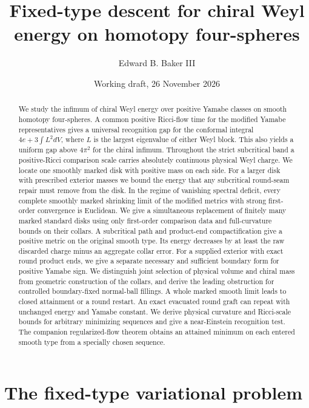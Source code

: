 \documentclass[11pt,letterpaper]{article}
\title{Fixed-type descent for chiral Weyl energy on homotopy four-spheres}
\author{Edward B. Baker III}
\date{Working draft, 26 November 2026}
\numberwithin{equation}{section}
\theoremstyle{remark}
\begin{document}
\maketitle

\begin{abstract}
We study the infimum of chiral Weyl energy over positive Yamabe
classes on smooth homotopy four-spheres. A common positive Ricci-flow
time for the modified Yamabe representatives gives a universal
recognition gap for the conformal integral \(4e+3\int L^2dV\),
where \(L\) is the largest eigenvalue of either Weyl block. This
also yields a uniform gap above \(4\pi^2\) for the chiral infimum. Throughout the strict subcritical band a positive-Ricci
comparison scale carries absolutely continuous physical Weyl charge.
We locate one smoothly marked disk with positive mass on each side.
For a larger disk with prescribed exterior masses we bound the energy
that any subcritical round-seam repair must remove from the disk.
In the regime of vanishing spectral deficit, every complete smoothly
marked shrinking limit of the modified metrics with strong first-order
convergence is Euclidean. We give a
simultaneous replacement of finitely many marked standard disks
using only first-order comparison data and full-curvature bounds
on their collars. A subcritical path and product-end compactification
give a positive metric on the original smooth type. Its energy
decreases by at least the raw discarded charge minus an aggregate
collar error. For a supplied exterior with exact round product ends,
we give a separate necessary and sufficient boundary form for positive
Yamabe sign. We distinguish joint selection of physical volume and
chiral mass from geometric construction of the collars, and derive
the leading obstruction for controlled boundary-fixed normal-ball
fillings. A whole marked smooth limit leads to closed attainment or a
round restart. An exact evacuated round graft can repeat with unchanged
energy and Yamabe constant. We derive physical curvature and
Ricci-scale bounds for arbitrary minimizing sequences and give a
near-Einstein recognition test. The companion regularized-flow theorem
obtains an attained minimum on each entered smooth type from a
specially chosen sequence.
\end{abstract}

\section{The fixed-type variational problem}
\end{document}
